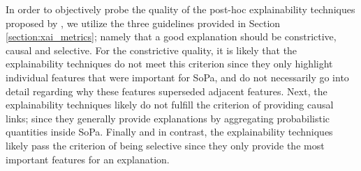 In order to objectively probe the quality of the post-hoc explainability
techniques proposed by \citet{schwartz2018sopa}, we utilize the three guidelines
provided in Section \ref{section:xai_metrics}; namely that a good explanation
should be constrictive, causal and selective. For the constrictive quality, it
is likely that the explainability techniques do not meet this criterion since they
only highlight individual features that were important for SoPa, and do not
necessarily go into detail regarding why these features superseded adjacent
features. Next, the explainability techniques likely do not fulfill the criterion
of providing causal links; since they generally provide explanations by
aggregating probabilistic quantities inside SoPa. Finally and in
contrast, the explainability techniques likely pass the criterion of being
selective since they only provide the most important features for an
explanation.

